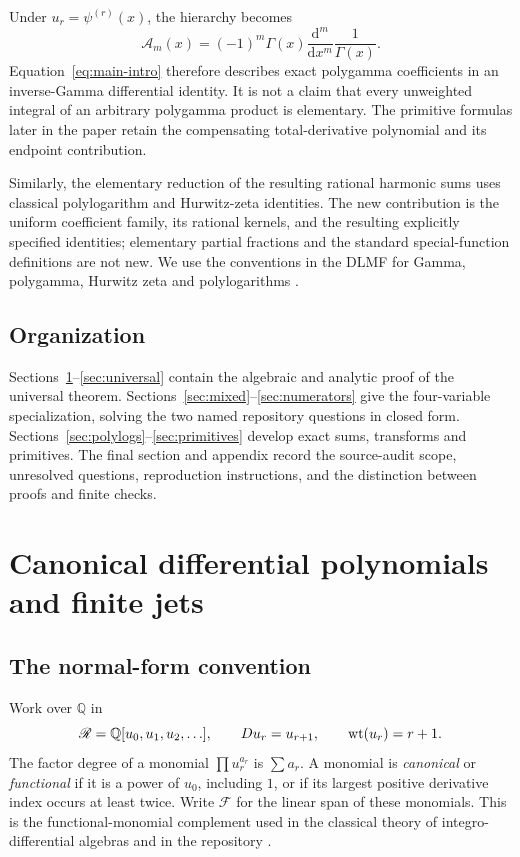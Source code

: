 \documentclass[11pt,letterpaper]{article}
\numberwithin{equation}{section}
\theoremstyle{plain}
\theoremstyle{definition}
\theoremstyle{remark}
\newcommand{\Q}{\mathbb Q}\newcommand{\C}{\mathbb C}\newcommand{\N}{\mathbb N}
\newcommand{\Rcal}{\mathscr R}\newcommand{\Fcal}{\mathscr F}
\newcommand{\Ac}{\mathcal A}\newcommand{\Nc}{\mathcal N}\newcommand{\Hc}{\mathcal H}
\begin{document}
Under $u_r=\psi^{(r)}(x)$, the hierarchy becomes
\[
 \Ac_m(x)=(-1)^m\Gamma(x)\frac{\mathrm d^m}{\mathrm dx^m}
                         \frac1{\Gamma(x)}.
\]
Equation~\eqref{eq:main-intro} therefore describes exact polygamma coefficients in an inverse-Gamma differential identity. It is not a claim that every unweighted integral of an arbitrary polygamma product is elementary. The primitive formulas later in the paper retain the compensating total-derivative polynomial and its endpoint contribution.

Similarly, the elementary reduction of the resulting rational harmonic sums uses classical polylogarithm and Hurwitz-zeta identities. The new contribution is the uniform coefficient family, its rational kernels, and the resulting explicitly specified identities; elementary partial fractions and the standard special-function definitions are not new. We use the conventions in the DLMF for Gamma, polygamma, Hurwitz zeta and polylogarithms \cite{DLMFGamma,DLMFHurwitz,DLMFPolylog}.

\subsection{Organization}

Sections~\ref{sec:algebra}--\ref{sec:universal} contain the algebraic and analytic proof of the universal theorem. Sections~\ref{sec:mixed}--\ref{sec:numerators} give the four-variable specialization, solving the two named repository questions in closed form. Sections~\ref{sec:polylogs}--\ref{sec:primitives} develop exact sums, transforms and primitives. The final section and appendix record the source-audit scope, unresolved questions, reproduction instructions, and the distinction between proofs and finite checks.



\section{Canonical differential polynomials and finite jets}
\label{sec:algebra}

\subsection{The normal-form convention}

Work over $\Q$ in
\[
 \Rcal=\Q[u_0,u_1,u_2,\ldots],\qquad Du_r=u_{r+1},
 \qquad \wt(u_r)=r+1.
\]
The factor degree of a monomial $\prod u_r^{a_r}$ is $\sum a_r$. A monomial is \emph{canonical} or \emph{functional} if it is a power of $u_0$, including $1$, or if its largest positive derivative index occurs at least twice. Write $\Fcal$ for the linear span of these monomials. This is the functional-monomial complement used in the classical theory of integro-differential algebras \cite[Proposition 4.10]{Guo2014} and in the repository \cite{RepoSector}.
\end{document}
